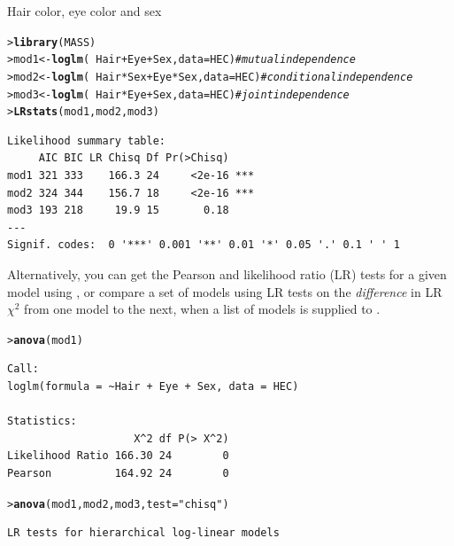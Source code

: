 \documentclass[10pt,krantz2]{krantz}\usepackage[]{graphicx}\usepackage[]{color}
\makeatletter
\newcommand{\hlstr}[1]{\textcolor[rgb]{0.192,0.494,0.8}{#1}}%
\newcommand{\hlcom}[1]{\textcolor[rgb]{0.678,0.584,0.686}{\textit{#1}}}%
\newcommand{\hlopt}[1]{\textcolor[rgb]{0,0,0}{#1}}%
\newcommand{\hlstd}[1]{\textcolor[rgb]{0.345,0.345,0.345}{#1}}%
\newcommand{\hlkwb}[1]{\textcolor[rgb]{0.69,0.353,0.396}{#1}}%
\newcommand{\hlkwc}[1]{\textcolor[rgb]{0.333,0.667,0.333}{#1}}%
\newcommand{\hlkwd}[1]{\textcolor[rgb]{0.737,0.353,0.396}{\textbf{#1}}}%
\newenvironment{kframe}{%
 \def\at@end@of@kframe{}%
 \ifinner\ifhmode%
  \def\at@end@of@kframe{\end{minipage}}%
  \begin{minipage}{\columnwidth}%
 \fi\fi%
 \def\FrameCommand##1{\hskip\@totalleftmargin \hskip-\fboxsep
 \colorbox{shadecolor}{##1}\hskip-\fboxsep
     \hskip-\linewidth \hskip-\@totalleftmargin \hskip\columnwidth}%
 \MakeFramed {\advance\hsize-\width
   \@totalleftmargin\z@ \linewidth\hsize
   \@setminipage}}%
 {\par\unskip\endMakeFramed%
 \at@end@of@kframe}
\newenvironment{knitrout}{}{} %
\renewenvironment{knitrout}{\small\renewcommand{\baselinestretch}{.85}}{} %
\makeatother
\begin{document}
\begin{Example}[HEC2]{Hair color, eye color and sex}
\begin{knitrout}
\color{fgcolor}\begin{kframe}
\begin{alltt}
\hlstd{> }\hlkwd{library}\hlstd{(MASS)}
\hlstd{> }\hlstd{mod1} \hlkwb{<-} \hlkwd{loglm}\hlstd{(}\hlopt{~} \hlstd{Hair} \hlopt{+} \hlstd{Eye} \hlopt{+} \hlstd{Sex,} \hlkwc{data} \hlstd{= HEC)}       \hlcom{# mutual independence}
\hlstd{> }\hlstd{mod2} \hlkwb{<-} \hlkwd{loglm}\hlstd{(}\hlopt{~} \hlstd{Hair} \hlopt{*} \hlstd{Sex} \hlopt{+} \hlstd{Eye} \hlopt{*} \hlstd{Sex,} \hlkwc{data} \hlstd{= HEC)} \hlcom{# conditional independence}
\hlstd{> }\hlstd{mod3} \hlkwb{<-} \hlkwd{loglm}\hlstd{(}\hlopt{~} \hlstd{Hair} \hlopt{*} \hlstd{Eye} \hlopt{+} \hlstd{Sex,} \hlkwc{data} \hlstd{= HEC)}       \hlcom{# joint independence}
\hlstd{> }\hlkwd{LRstats}\hlstd{(mod1, mod2, mod3)}
\end{alltt}
\begin{verbatim}
Likelihood summary table:
     AIC BIC LR Chisq Df Pr(>Chisq)    
mod1 321 333    166.3 24     <2e-16 ***
mod2 324 344    156.7 18     <2e-16 ***
mod3 193 218     19.9 15       0.18    
---
Signif. codes:  0 '***' 0.001 '**' 0.01 '*' 0.05 '.' 0.1 ' ' 1
\end{verbatim}
\end{kframe}
\end{knitrout}
Alternatively, you can get the Pearson and likelihood ratio (LR) tests
for a given model using ,
or compare a set of models using LR tests on the \emph{difference} in
LR $\chi^2$ from one model to the next, when a list of models is supplied
to .
\begin{knitrout}
\color{fgcolor}\begin{kframe}
\begin{alltt}
\hlstd{> }\hlkwd{anova}\hlstd{(mod1)}
\end{alltt}
\begin{verbatim}
Call:
loglm(formula = ~Hair + Eye + Sex, data = HEC)

Statistics:
                    X^2 df P(> X^2)
Likelihood Ratio 166.30 24        0
Pearson          164.92 24        0
\end{verbatim}
\begin{alltt}
\hlstd{> }\hlkwd{anova}\hlstd{(mod1, mod2, mod3,} \hlkwc{test} \hlstd{=} \hlstr{"chisq"}\hlstd{)}
\end{alltt}
\begin{verbatim}
LR tests for hierarchical log-linear models


\end{verbatim}
\end{kframe}
\end{knitrout}
\end{Example}
\end{document}
